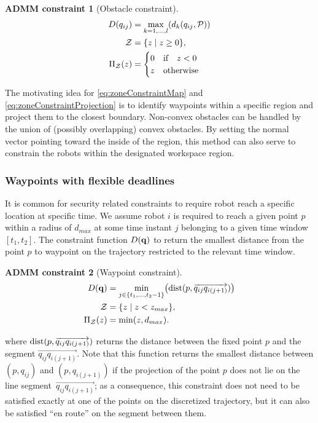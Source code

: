 \documentclass[journal]{IEEEtran}  %
\newtheorem{constraint}{ADMM constraint}
\def\sZ{\mathcal{Z}}
\begin{document}
\begin{constraint}[Obstacle constraint]
\begin{align}
     	D(q_{ij}) &= \max_{k=1,\dots,l} (d_{k}(q_{ij},\cP))\\
\label{eq:obstacle_constraint}
  \sZ &= \{z \mid z \geq 0 \},\\
   \Pi_\sZ(z) & = \begin{cases}
   0 & \textrm{if} \quad z < 0\\
   z  & \textrm{otherwise}
   \end{cases}
\end{align}
\end{constraint}

The motivating idea for \eqref{eq:zoneConstraintMap} and \eqref{eq:zoneConstraintProjection} is to identify waypoints within a specific region and project them to the closest boundary. Non-convex obstacles can be handled by the union of (possibly overlapping) convex obstacles. By setting the normal vector pointing toward the inside of the region, this method can also serve to constrain the robots within the designated workspace region.

\subsubsection*{Waypoints with flexible deadlines}
It is common for security related constraints to require robot reach a specific location at specific time. We assume robot $i$ is required to reach a given point $p$ within a radius of $d_{max}$ at some time instant $j$ belonging to a given time window $[t_1,t_2]$. The constraint function $D(\mathbf{q})$ to return the smallest distance from the point $p$ to waypoint on the trajectory restricted to the relevant time window. 
\begin{constraint}[Waypoint constraint]
\begin{align}
     	D(\vq) &= \min_{j\in\{t_1,\dots,t_2-1\}}\bigl(\dist(p,\overrightarrow{q_{ij}q_{i(j+1)}})\bigr)\\
\label{eq:obstacle_constraint}
  \sZ &= \{z \mid z < z_{max} \},\\
   \Pi_\sZ(z) & = \min(z, d_{max}).
\end{align}
\end{constraint}

where $\operatorname{dist}(p,\overrightarrow{q_{ij}q_{i(j+1)}})$ returns the distance between the fixed point $p$ and the segment $\overrightarrow{q_{ij}q_{i(j+1)}}$. Note that this function returns the smallest distance between $(p,q_{ij})$ and $(p,q_{i(j+1)})$ if the projection of the point $p$ does not lie on the line segment~$\overrightarrow{q_{ij}q_{i(j+1)}}$; as a consequence, this constraint does not need to be satisfied exactly at one of the points on the discretized trajectory, but it can also be satisfied ``en route'' on the segment between them.
\end{document}
